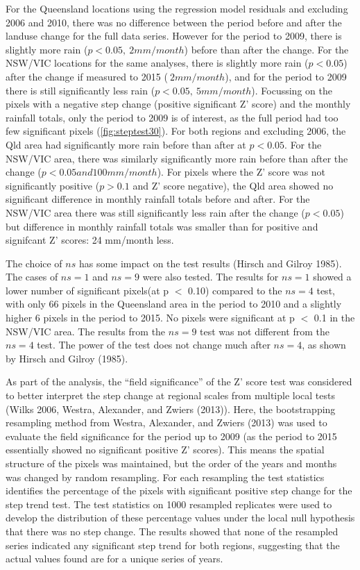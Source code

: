 \documentclass[]{elsarticle} %
\theoremstyle{definition}
\theoremstyle{definition}
\theoremstyle{definition}
\theoremstyle{remark}
\begin{document}
For the Queensland locations using the regression model residuals and
excluding 2006 and 2010, there was no difference between the period
before and after the landuse change for the full data series. However
for the period to 2009, there is slightly more rain
(\(p < 0.05, ~ 2mm/month\)) before than after the change. For the
NSW/VIC locations for the same analyses, there is slightly more rain
(\(p < 0.05\)) after the change if measured to 2015 (\(~ 2 mm/month\)),
and for the period to 2009 there is still significantly less rain
(\(p < 0.05, ~ 5 mm/month\)). Focussing on the pixels with a negative
step change (positive significant Z' score) and the monthly rainfall
totals, only the period to 2009 is of interest, as the full period had
too few significant pixels (\ref{fig:steptest30}). For both regions and
excluding 2006, the Qld area had significantly more rain before than
after at \(p < 0.05\). For the NSW/VIC area, there was similarly
significantly more rain before than after the change
(\(p < 0.05 and 100mm/month\)). For pixels where the Z' score was not
significantly positive (\(p > 0.1\) and Z' score negative), the Qld area
showed no significant difference in monthly rainfall totals before and
after. For the NSW/VIC area there was still significantly less rain
after the change (\(p < 0.05\)) but difference in monthly rainfall
totals was smaller than for positive and signifcant Z' scores: 24
mm/month less.

The choice of \(ns\) has some impact on the test results (Hirsch and
Gilroy 1985). The cases of \(ns = 1\) and \(ns = 9\) were also tested.
The results for \(ns = 1\) showed a lower number of significant
pixels(at p \(<\) 0.10) compared to the \(ns = 4\) test, with only 66
pixels in the Queensland area in the period to 2010 and a slightly
higher 6 pixels in the period to 2015. No pixels were significant at p
\(<\) 0.1 in the NSW/VIC area. The results from the \(ns = 9\) test was
not different from the \(ns = 4\) test. The power of the test does not
change much after \(ns = 4\), as shown by Hirsch and Gilroy (1985).

As part of the analysis, the ``field significance'' of the Z' score test
was considered to better interpret the step change at regional scales
from multiple local tests (Wilks 2006, Westra, Alexander, and Zwiers
(2013)). Here, the bootstrapping resampling method from Westra,
Alexander, and Zwiers (2013) was used to evaluate the field significance
for the period up to 2009 (as the period to 2015 essentially showed no
significant positive Z' scores). This means the spatial structure of the
pixels was maintained, but the order of the years and months was changed
by random resampling. For each resampling the test statistics identifies
the percentage of the pixels with significant positive step change for
the step trend test. The test statistics on 1000 resampled replicates
were used to develop the distribution of these percentage values under
the local null hypothesis that there was no step change. The results
showed that none of the resampled series indicated any significant step
trend for both regions, suggesting that the actual values found are for
a unique series of years.
\end{document}
